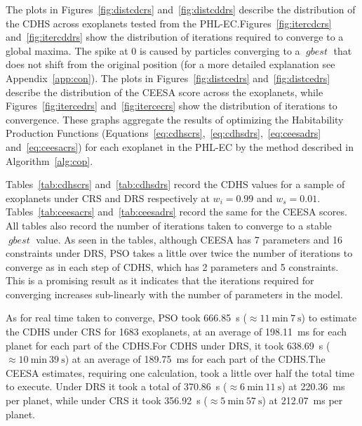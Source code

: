 \documentclass[10pt]{article}
\DeclareMathOperator*{\gbest}{\mathit{gbest}}
\begin{document}
The plots in Figures~\ref{fig:distcdcrs} and~\ref{fig:distcddrs} describe the distribution of the CDHS across exoplanets
tested from the PHL-EC.\@ Figures~\ref{fig:itercdcrs} and~\ref{fig:itercddrs} show the distribution of iterations
required to converge to a global maxima. The spike at 0 is caused by particles converging to a $\gbest$ that does not
shift from the original position (for a more detailed explanation see Appendix~\ref{app:con}). The plots in
Figures~\ref{fig:distcedrs} and~\ref{fig:distcedrs} describe the distribution of the CEESA score across the exoplanets,
while Figures~\ref{fig:itercedrs} and~\ref{fig:itercecrs} show the distribution of iterations to convergence. These
graphs aggregate the results of optimizing the Habitability Production Functions
(Equations~\ref{eq:cdhscrs},~\ref{eq:cdhsdrs},~\ref{eq:ceesadrs} and~\ref{eq:ceesacrs}) for each exoplanet in the PHL-EC
by the method described in Algorithm~\ref{alg:cop}.

Tables~\ref{tab:cdhscrs} and~\ref{tab:cdhsdrs} record the CDHS values for a sample of exoplanets under CRS and DRS
respectively at $w_i=0.99$ and $w_s=0.01$. Tables~\ref{tab:ceesacrs} and~\ref{tab:ceesadrs} record the same for the
CEESA scores. All tables also record the number of iterations taken to converge to a stable $\gbest$ value. As seen in
the tables, although CEESA has 7 parameters and 16 constraints under DRS, PSO takes a little over twice the number of
iterations to converge as in each step of CDHS, which has 2 parameters and 5 constraints. This is a promising result as
it indicates that the iterations required for converging increases sub-linearly with the number of parameters in the
model.

As for real time taken to converge, PSO took \SI{666.85}{\second} ($\approx\SI{11}{\minute}\ \SI{7}{\second}$) to
estimate the CDHS under CRS for \num{1683} exoplanets, at an average of \SI{198.11}{\milli\second} for each planet for
each part of the CDHS.\@ For CDHS under DRS, it took \SI{638.69}{\second} ($\approx\SI{10}{\minute}\ \SI{39}{\second}$)
at an average of \SI{189.75}{\milli\second} for each part of the CDHS.\@ The CEESA estimates, requiring one calculation,
took a little over half the total time to execute. Under DRS it took a total of \SI{370.86}{\second}
($\approx\SI{6}{\minute}\ \SI{11}{\second}$) at \SI{220.36}{\milli\second} per planet, while under CRS it took
\SI{356.92}{\second} ($\approx\SI{5}{\minute}\ \SI{57}{\second}$) at \SI{212.07}{\milli\second} per planet.
\end{document}
